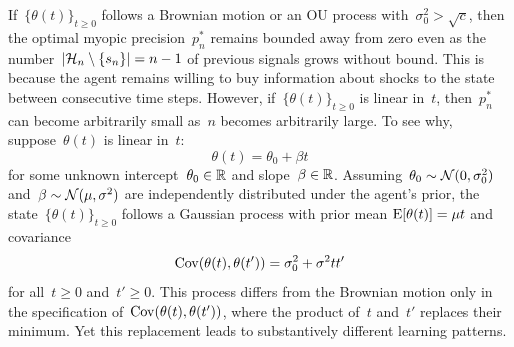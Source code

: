 \documentclass[11pt,oneside]{article}
\begin{document}
If~$\{\theta(t)\}_{t\ge0}$ follows a Brownian motion or an OU process with~$\sigma_0^2>\sqrt{c}$, then the optimal myopic precision~$p_n^*$ remains bounded away from zero even as the number~$\Abs{\Hcal_n\setminus\{s_n\}}=n-1$ of previous signals grows without bound.
This is because the agent remains willing to buy information about shocks to the state between consecutive time steps.
However, if~$\{\theta(t)\}_{t\ge0}$ is linear in~$t$, then~$p_n^*$ can become arbitrarily small as~$n$ becomes arbitrarily large.
To see why, suppose~$\theta(t)$ is linear in~$t$:
\[ \theta(t)=\theta_0+\beta t \]
for some unknown intercept~$\theta_0\in\mathbb{R}$ and slope~$\beta\in\mathbb{R}$.
Assuming~$\theta_0\sim\mathcal{N}(0,\sigma_0^2)$ and~$\beta\sim\mathcal{N}(\mu,\sigma^2)$ are independently distributed under the agent's prior, the state~$\{\theta(t)\}_{t\ge0}$ follows a Gaussian process with prior mean $\operatorname{E}[\theta(t)]=\mu t$ and covariance
%
\begin{equation}
    \operatorname{Cov}(\theta(t),\theta(t'))=\sigma_0^2+\sigma^2tt' \label{eq:covariance-linear}
\end{equation}
%
for all~$t\ge0$ and~$t'\ge0$.
This process differs from the Brownian motion only in the specification of~$\operatorname{Cov}(\theta(t),\theta(t'))$, where the product of~$t$ and~$t'$ replaces their minimum.
Yet this replacement leads to substantively different learning patterns.
\end{document}

